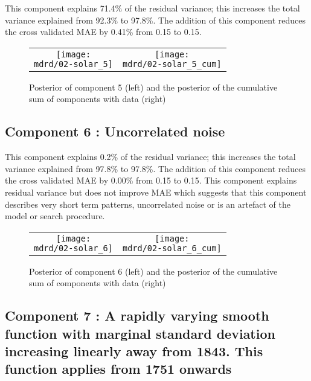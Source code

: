 \documentclass{article} %
\begin{document}


This component explains 71.4\% of the residual variance; this increases the total variance explained from 92.3\% to 97.8\%.
The addition of this component reduces the cross validated MAE by 0.41\% from 0.15 to 0.15.


\begin{figure}[H]
\newcommand{\wmgd}{0.5\columnwidth}
\newcommand{\hmgd}{3.0cm}
\newcommand{\mdrd}{figures/02-solar}
\newcommand{\mbm}{\hspace{-0.3cm}}
\begin{tabular}{cc}
\mbm \texttt{[image: \\mdrd/02-solar\_5]} & \texttt{[image: \\mdrd/02-solar\_5\_cum]}
\end{tabular}
\caption{Posterior of component 5 (left) and the posterior of the cumulative sum of components with data (right)}
\label{fig:comp5}
\end{figure}

\subsection{Component 6 : Uncorrelated noise}



This component explains 0.2\% of the residual variance; this increases the total variance explained from 97.8\% to 97.8\%.
The addition of this component reduces the cross validated MAE by 0.00\% from 0.15 to 0.15.
This component explains residual variance but does not improve MAE which suggests that this component describes very short term patterns, uncorrelated noise or is an artefact of the model or search procedure.

\begin{figure}[H]
\newcommand{\wmgd}{0.5\columnwidth}
\newcommand{\hmgd}{3.0cm}
\newcommand{\mdrd}{figures/02-solar}
\newcommand{\mbm}{\hspace{-0.3cm}}
\begin{tabular}{cc}
\mbm \texttt{[image: \\mdrd/02-solar\_6]} & \texttt{[image: \\mdrd/02-solar\_6\_cum]}
\end{tabular}
\caption{Posterior of component 6 (left) and the posterior of the cumulative sum of components with data (right)}
\label{fig:comp6}
\end{figure}

\subsection{Component 7 : A rapidly varying smooth function with marginal standard deviation increasing linearly away from 1843. This function applies from 1751 onwards}
\end{document}
